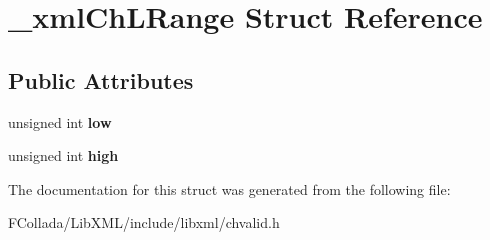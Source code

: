 \hypertarget{struct__xmlChLRange}{
\section{\_\-xmlChLRange Struct Reference}
\label{struct__xmlChLRange}
}
\subsection*{Public Attributes}
\begin{DoxyCompactItemize}
\item 
\hypertarget{struct__xmlChLRange_a800f5f23caaf4e69f2db471e198128b8}{
unsigned int {\bfseries low}}
\label{struct__xmlChLRange_a800f5f23caaf4e69f2db471e198128b8}

\item 
\hypertarget{struct__xmlChLRange_aae73630963e58384bec6d57ede374132}{
unsigned int {\bfseries high}}
\label{struct__xmlChLRange_aae73630963e58384bec6d57ede374132}

\end{DoxyCompactItemize}


The documentation for this struct was generated from the following file:\begin{DoxyCompactItemize}
\item 
FCollada/LibXML/include/libxml/chvalid.h\end{DoxyCompactItemize}
